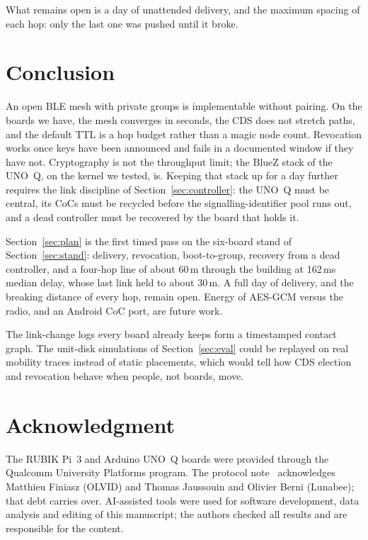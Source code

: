 \documentclass[conference,10pt]{IEEEtran}
\begin{document}
What remains open is a day of unattended delivery, and the maximum
spacing of each hop: only the last one was pushed until it broke.

\section{Conclusion}
\label{sec:concl}

An open BLE mesh with private groups is implementable without pairing.
On the boards we have, the mesh converges in seconds, the CDS does not
stretch paths, and the default TTL is a hop budget rather than a magic
node count. Revocation works once keys have been announced and fails in
a documented window if they have not. Cryptography is not the throughput
limit; the BlueZ stack of the UNO~Q, on the kernel we tested, is. Keeping
that stack up for a day further requires the link discipline of
Section~\ref{sec:controller}: the UNO~Q must be central, its CoCs must be
recycled before the signalling-identifier pool runs out, and a dead
controller must be recovered by the board that holds it.

Section~\ref{sec:plan} is the first timed pass on the six-board stand of
Section~\ref{sec:stand}: delivery, revocation, boot-to-group,
recovery from a dead controller, and a four-hop line of about 60\,m
through the building at 162\,ms median delay, whose last link held to
about 30\,m. A full day of delivery, and the breaking distance of every
hop, remain open. Energy of AES-GCM versus the radio,
and an Android CoC port, are future work.

The link-change logs every board already keeps form a timestamped
contact graph. The unit-disk simulations of Section~\ref{sec:eval} could
be replayed on real mobility traces instead of static placements, which
would tell how CDS election and revocation behave when people, not
boards, move.

\section*{Acknowledgment}

The RUBIK Pi~3 and Arduino UNO~Q boards were provided through the
Qualcomm University Platforms program. The protocol
note~\cite{achir2025bb} acknowledges Matthieu Finiasz (OLVID) and Thomas
Jaussouin and Olivier Berni (Lunabee); that debt carries over.
AI-assisted tools were used for software development, data analysis
and editing of this manuscript; the authors checked all results and are
responsible for the content.



\end{document}
